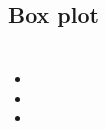 \documentclass{beamer}
\begin{document}
\subsection{Box plot}
\begin{frame}
\end{frame}

\section{}
\begin{frame}
\frametitle{}

\begin{itemize}
\item
\item
\item
\end{itemize}


\end{frame}


\end{document}
